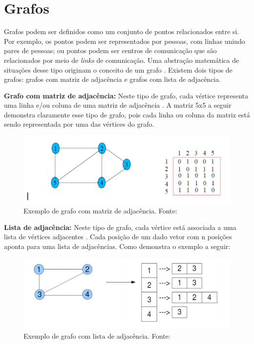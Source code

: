 \section{Grafos}

	Grafos podem ser definidos como um conjunto de pontos relacionados entre si. Por exemplo, os pontos podem ser representados por pessoas, com linhas unindo pares de pessoas; ou pontos podem ser centros de comunicação que são relacionados por meio de \textit{links} de comunicação. Uma abstração matemática de situações desse tipo originam o conceito de um grafo \cite{bondy1976graph}. Existem dois tipos de grafos: grafos com matriz de adjacência e grafos com lista de adjacência.
	
\textbf{Grafo com matriz de adjacência:} Neste tipo de grafo, cada vértice representa uma linha e/ou coluna de uma matriz de adjacência \cite{monteiro2010graph}. A matriz 5x5 a seguir demonstra claramente esse tipo de grafo, pois cada linha ou coluna da matriz está sendo representada por uma das vértices do grafo.

\begin{figure}[h] 
\centering 
\includegraphics[scale=0.6]{Figuras/grafo1.png} 
\caption[ Exemplo de grafo com matriz de adjacência]
{ Exemplo de grafo com matriz de adjacência. Fonte: \cite{DanielaLucas2008}}
\label{fig:grafo1}
\end{figure}



\textbf{Lista de adjacência:} Neste tipo de grafo, cada vértice está associada a uma lista de vértices adjacentes \cite{monteiro2010graph}. Cada posição de um dado vetor com n posições aponta para uma lista de adjacências. Como demonstra o exemplo a seguir:


\begin{figure}[h] 
\centering 
\includegraphics[scale=0.6]{Figuras/grafo2.png} 
\caption[Exemplo de grafo com lista de adjacência]
{ Exemplo de grafo com lista de adjacência. Fonte: \cite{DanielaLucas2008}}
\label{fig:grafo1}
\end{figure}



